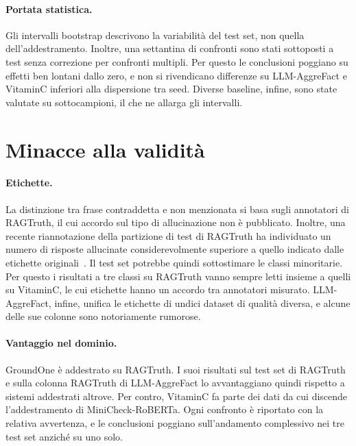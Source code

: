 \paragraph{Portata statistica.} Gli intervalli bootstrap descrivono la variabilità del test set, non quella
dell'addestramento. Inoltre, una settantina di confronti sono stati sottoposti a test senza correzione per confronti
multipli. Per questo le conclusioni poggiano su effetti ben lontani dallo zero, e non si rivendicano differenze su
LLM-AggreFact e VitaminC inferiori alla dispersione tra seed. Diverse baseline, infine, sono state valutate su
sottocampioni, il che ne allarga gli intervalli.

\section{Minacce alla validità}
\label{sec:disc-threats}

\paragraph{Etichette.} La distinzione tra frase contraddetta e non menzionata si basa sugli annotatori di RAGTruth, il
cui accordo sul tipo di allucinazione non è pubblicato. Inoltre, una recente riannotazione della partizione di test di
RAGTruth ha individuato un numero di risposte allucinate considerevolmente superiore a quello indicato dalle etichette
originali~\cite{yu2026retromorphic}. Il test set potrebbe quindi sottostimare le classi minoritarie. Per questo i
risultati a tre classi su RAGTruth vanno sempre letti insieme a quelli su VitaminC, le cui etichette hanno un accordo tra
annotatori misurato. LLM-AggreFact, infine, unifica le etichette di undici dataset di qualità diversa, e alcune delle sue
colonne sono notoriamente rumorose.

\paragraph{Vantaggio nel dominio.} GroundOne è addestrato su RAGTruth. I suoi risultati sul test set di RAGTruth e sulla
colonna RAGTruth di LLM-AggreFact lo avvantaggiano quindi rispetto a sistemi addestrati altrove. Per contro, VitaminC fa
parte dei dati da cui discende l'addestramento di MiniCheck-RoBERTa. Ogni confronto è riportato con la relativa
avvertenza, e le conclusioni poggiano sull'andamento complessivo nei tre test set anziché su uno solo.

